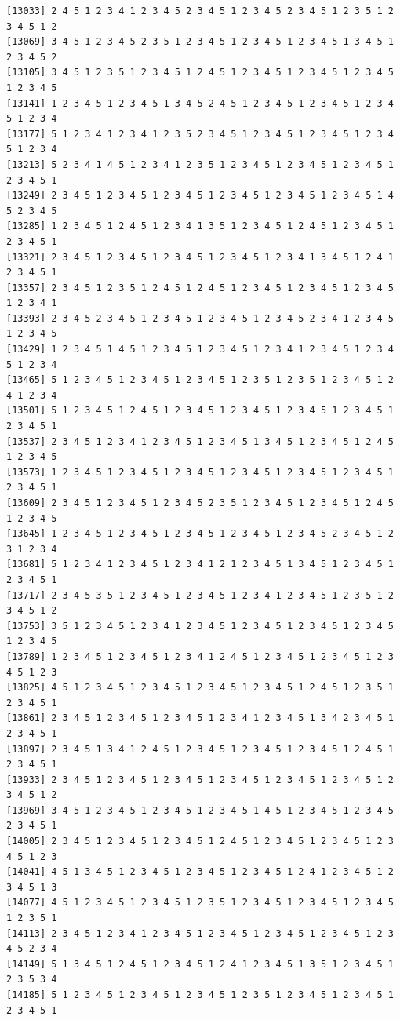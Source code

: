 \documentclass[
  english,
]{book}
\begin{document}
\begin{verbatim}
[13033] 2 4 5 1 2 3 4 1 2 3 4 5 2 3 4 5 1 2 3 4 5 2 3 4 5 1 2 3 5 1 2 3 4 5 1 2
[13069] 3 4 5 1 2 3 4 5 2 3 5 1 2 3 4 5 1 2 3 4 5 1 2 3 4 5 1 3 4 5 1 2 3 4 5 2
[13105] 3 4 5 1 2 3 5 1 2 3 4 5 1 2 4 5 1 2 3 4 5 1 2 3 4 5 1 2 3 4 5 1 2 3 4 5
[13141] 1 2 3 4 5 1 2 3 4 5 1 3 4 5 2 4 5 1 2 3 4 5 1 2 3 4 5 1 2 3 4 5 1 2 3 4
[13177] 5 1 2 3 4 1 2 3 4 1 2 3 5 2 3 4 5 1 2 3 4 5 1 2 3 4 5 1 2 3 4 5 1 2 3 4
[13213] 5 2 3 4 1 4 5 1 2 3 4 1 2 3 5 1 2 3 4 5 1 2 3 4 5 1 2 3 4 5 1 2 3 4 5 1
[13249] 2 3 4 5 1 2 3 4 5 1 2 3 4 5 1 2 3 4 5 1 2 3 4 5 1 2 3 4 5 1 4 5 2 3 4 5
[13285] 1 2 3 4 5 1 2 4 5 1 2 3 4 1 3 5 1 2 3 4 5 1 2 4 5 1 2 3 4 5 1 2 3 4 5 1
[13321] 2 3 4 5 1 2 3 4 5 1 2 3 4 5 1 2 3 4 5 1 2 3 4 1 3 4 5 1 2 4 1 2 3 4 5 1
[13357] 2 3 4 5 1 2 3 5 1 2 4 5 1 2 4 5 1 2 3 4 5 1 2 3 4 5 1 2 3 4 5 1 2 3 4 1
[13393] 2 3 4 5 2 3 4 5 1 2 3 4 5 1 2 3 4 5 1 2 3 4 5 2 3 4 1 2 3 4 5 1 2 3 4 5
[13429] 1 2 3 4 5 1 4 5 1 2 3 4 5 1 2 3 4 5 1 2 3 4 1 2 3 4 5 1 2 3 4 5 1 2 3 4
[13465] 5 1 2 3 4 5 1 2 3 4 5 1 2 3 4 5 1 2 3 5 1 2 3 5 1 2 3 4 5 1 2 4 1 2 3 4
[13501] 5 1 2 3 4 5 1 2 4 5 1 2 3 4 5 1 2 3 4 5 1 2 3 4 5 1 2 3 4 5 1 2 3 4 5 1
[13537] 2 3 4 5 1 2 3 4 1 2 3 4 5 1 2 3 4 5 1 3 4 5 1 2 3 4 5 1 2 4 5 1 2 3 4 5
[13573] 1 2 3 4 5 1 2 3 4 5 1 2 3 4 5 1 2 3 4 5 1 2 3 4 5 1 2 3 4 5 1 2 3 4 5 1
[13609] 2 3 4 5 1 2 3 4 5 1 2 3 4 5 2 3 5 1 2 3 4 5 1 2 3 4 5 1 2 4 5 1 2 3 4 5
[13645] 1 2 3 4 5 1 2 3 4 5 1 2 3 4 5 1 2 3 4 5 1 2 3 4 5 2 3 4 5 1 2 3 1 2 3 4
[13681] 5 1 2 3 4 1 2 3 4 5 1 2 3 4 1 2 1 2 3 4 5 1 3 4 5 1 2 3 4 5 1 2 3 4 5 1
[13717] 2 3 4 5 3 5 1 2 3 4 5 1 2 3 4 5 1 2 3 4 1 2 3 4 5 1 2 3 5 1 2 3 4 5 1 2
[13753] 3 5 1 2 3 4 5 1 2 3 4 1 2 3 4 5 1 2 3 4 5 1 2 3 4 5 1 2 3 4 5 1 2 3 4 5
[13789] 1 2 3 4 5 1 2 3 4 5 1 2 3 4 1 2 4 5 1 2 3 4 5 1 2 3 4 5 1 2 3 4 5 1 2 3
[13825] 4 5 1 2 3 4 5 1 2 3 4 5 1 2 3 4 5 1 2 3 4 5 1 2 4 5 1 2 3 5 1 2 3 4 5 1
[13861] 2 3 4 5 1 2 3 4 5 1 2 3 4 5 1 2 3 4 1 2 3 4 5 1 3 4 2 3 4 5 1 2 3 4 5 1
[13897] 2 3 4 5 1 3 4 1 2 4 5 1 2 3 4 5 1 2 3 4 5 1 2 3 4 5 1 2 4 5 1 2 3 4 5 1
[13933] 2 3 4 5 1 2 3 4 5 1 2 3 4 5 1 2 3 4 5 1 2 3 4 5 1 2 3 4 5 1 2 3 4 5 1 2
[13969] 3 4 5 1 2 3 4 5 1 2 3 4 5 1 2 3 4 5 1 4 5 1 2 3 4 5 1 2 3 4 5 2 3 4 5 1
[14005] 2 3 4 5 1 2 3 4 5 1 2 3 4 5 1 2 4 5 1 2 3 4 5 1 2 3 4 5 1 2 3 4 5 1 2 3
[14041] 4 5 1 3 4 5 1 2 3 4 5 1 2 3 4 5 1 2 3 4 5 1 2 4 1 2 3 4 5 1 2 3 4 5 1 3
[14077] 4 5 1 2 3 4 5 1 2 3 4 5 1 2 3 5 1 2 3 4 5 1 2 3 4 5 1 2 3 4 5 1 2 3 5 1
[14113] 2 3 4 5 1 2 3 4 1 2 3 4 5 1 2 3 4 5 1 2 3 4 5 1 2 3 4 5 1 2 3 4 5 2 3 4
[14149] 5 1 3 4 5 1 2 4 5 1 2 3 4 5 1 2 4 1 2 3 4 5 1 3 5 1 2 3 4 5 1 2 3 5 3 4
[14185] 5 1 2 3 4 5 1 2 3 4 5 1 2 3 4 5 1 2 3 5 1 2 3 4 5 1 2 3 4 5 1 2 3 4 5 1

\end{verbatim}
\end{document}
